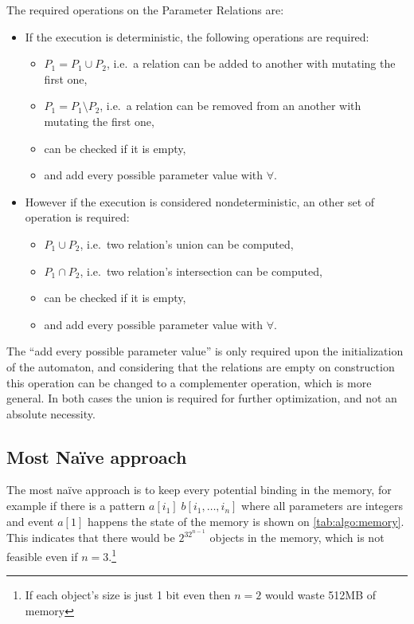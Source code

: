 	The required operations on the Parameter Relations are:
	\begin{itemize}
		\item If the execution is deterministic, the following operations are required:
			\begin{itemize}
				\item $P_1 = P_1 \cup P_2$, i.e.~a relation can be added to another with mutating the first one,
				\item $P_1 = P_1 \setminus P_2$, i.e.~a relation can be removed from an another with mutating the first one,
				\item can be checked if it is empty,
				\item and add every possible parameter value with $\forall$.
			\end{itemize}
		\item However if the execution is considered nondeterministic, an other set of operation is required:
			\begin{itemize}
				\item $P_1 \cup P_2$, i.e.~two relation's union can be computed,
				\item $P_1 \cap P_2$, i.e.~two relation's intersection can be computed,
				\item can be checked if it is empty,
				\item and add every possible parameter value with $\forall$.
			\end{itemize}
	\end{itemize}

	The ``add every possible parameter value'' is only required upon the initialization of the automaton, and considering that the relations are empty on construction this operation can be changed to a complementer operation, which is more general.
	In both cases the union is required for further optimization, and not an absolute necessity.

	\subsection{Most Na\"ive approach}
	
	The most na\"ive approach is to keep every potential binding in the memory, for example if there is a pattern $a[i_1]\;b[i_1,\dots,i_n]$ where all parameters are integers and event $a[1]$ happens the state of the memory is shown on \cref{tab:algo:memory}. This indicates that there would be $2^{32^{n-1}}$ objects in the memory, which is not feasible even if $n=3$.\footnote{If each object's size is just 1 bit even then $n=2$ would waste 512MB of memory}
	
